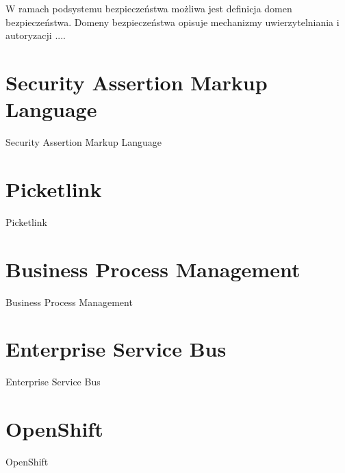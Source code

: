 		W ramach podsystemu bezpieczeństwa możliwa jest definicja domen bezpieczeństwa. Domeny bezpieczeństwa opisuje mechanizmy uwierzytelniania i autoryzacji ....


\section{Security Assertion Markup Language}
\label{sec:saml}

Security Assertion Markup Language


\section{Picketlink}
\label{sec:picketlink}

Picketlink


\section{Business Process Management}
\label{sec:bpm}

Business Process Management


\section{Enterprise Service Bus}
\label{sec:esb}

Enterprise Service Bus


\section{OpenShift}
\label{sec:openShift}

OpenShift

